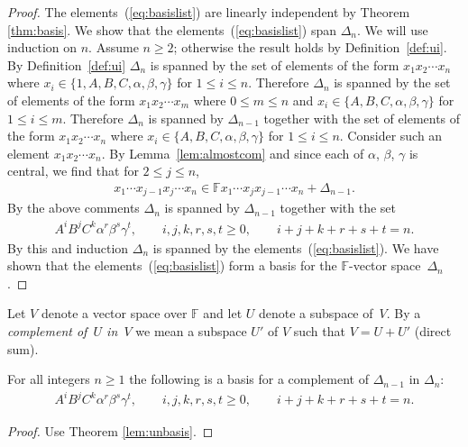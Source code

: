 \begin{proof}
The elements~(\ref{eq:basislist}) are linearly independent by
Theorem
\ref{thm:basis}. We show that the
elements~(\ref{eq:basislist}) span $\Delta_n$.
We will use induction on $n$. Assume $n\geq 2$; otherwise
the result holds by Def\/inition~\ref{def:ui}.
By Def\/inition~\ref{def:ui} $\Delta_n$ is
spanned by the set of elements of the form
$x_1x_2\cdots x_n$
where $x_i \in \lbrace 1, A,B,C,\alpha,\beta,\gamma\rbrace$
for $1 \leq i \leq n$.
Therefore $\Delta_n$ is spanned by the set of elements
of the form
$x_1x_2\cdots x_m$ where $0 \leq m\leq n$ and
$x_i \in \lbrace A,B,C,\alpha,\beta,\gamma\rbrace$
for $1 \leq i \leq m$.
Therefore $\Delta_n$ is spanned by $\Delta_{n-1}$ together with
the set of elements
of the form
$x_1x_2\cdots x_n$ where
$x_i \in \lbrace A,B,C,\alpha,\beta,\gamma\rbrace$
for $1 \leq i \leq n$.
Consider such an element
$x_1x_2\cdots x_n$.
By Lemma~\ref{lem:almostcom} and since
each of $\alpha$, $\beta$, $\gamma$ is central,
we f\/ind that
for $2 \leq j \leq n$,
\begin{gather*}
x_1\cdots  x_{j-1}x_j\cdots  x_n \in
\mathbb F x_1\cdots x_{j}x_{j-1}\cdots  x_n + \Delta_{n-1}.
\end{gather*}
By the above comments
$\Delta_n$ is spanned by $\Delta_{n-1}$ together with the
set
\begin{gather*}
A^iB^jC^k\alpha^r \beta^s \gamma^t, \qquad
i,j,k,r,s,t\geq 0, \qquad
i+j+k+r+s+t = n.
\end{gather*}
By this and induction
$\Delta_n$ is spanned by the elements~(\ref{eq:basislist}).
We have shown that
the elements~(\ref{eq:basislist}) form a basis  for the $\mathbb F$-vector space~$\Delta_n$.
\end{proof}

  Let $V$ denote a vector space over
$\mathbb F$ and let $U$ denote a subspace of~$V$.
By a {\it complement of~$U$ in~$V$} we mean
a subspace $U'$ of $V$ such that
$V=U+U'$ (direct sum).


\begin{Corollary}
\label{lem:com}
For all integers $n\geq 1$ the following is a basis
for a complement of $\Delta_{n-1}$ in $\Delta_n$:
\begin{gather*}
A^iB^jC^k\alpha^r \beta^s \gamma^t, \qquad
i,j,k,r,s,t\geq 0, \qquad
i+j+k+r+s+t = n.
\end{gather*}
\end{Corollary}
\begin{proof}
Use Theorem
\ref{lem:unbasis}.
\end{proof}



